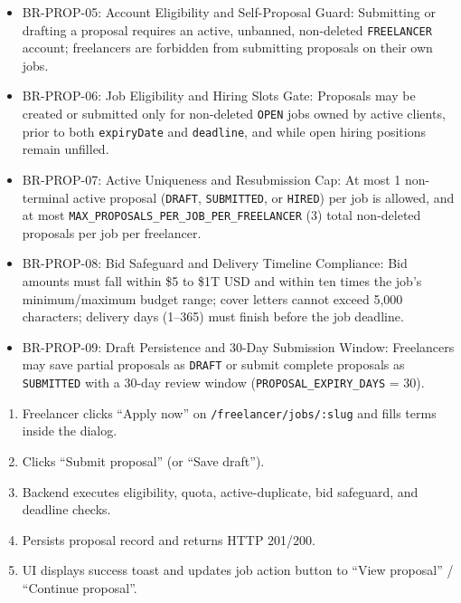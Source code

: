 \begin{itemize}[leftmargin=1.6em,topsep=3pt,itemsep=2pt,parsep=0pt,label=$\bullet$]\brrulelist
    \item BR-PROP-05: Account Eligibility and Self-Proposal Guard: Submitting or drafting a proposal requires an active, unbanned, non-deleted \texttt{FREELANCER} account; freelancers are forbidden from submitting proposals on their own jobs.
    \item BR-PROP-06: Job Eligibility and Hiring Slots Gate: Proposals may be created or submitted only for non-deleted \texttt{OPEN} jobs owned by active clients, prior to both \texttt{expiryDate} and \texttt{deadline}, and while open hiring positions remain unfilled.
    \item BR-PROP-07: Active Uniqueness and Resubmission Cap: At most 1 non-terminal active proposal (\texttt{DRAFT}, \texttt{SUBMITTED}, or \texttt{HIRED}) per job is allowed, and at most \texttt{MAX\_PROPOSALS\_PER\_JOB\_PER\_FREELANCER} (3) total non-deleted proposals per job per freelancer.
    \item BR-PROP-08: Bid Safeguard and Delivery Timeline Compliance: Bid amounts must fall within \$5 to \$1T USD and within ten times the job's minimum/maximum budget range; cover letters cannot exceed 5,000 characters; delivery days (1--365) must finish before the job deadline.
    \item BR-PROP-09: Draft Persistence and 30-Day Submission Window: Freelancers may save partial proposals as \texttt{DRAFT} or submit complete proposals as \texttt{SUBMITTED} with a 30-day review window (\texttt{PROPOSAL\_EXPIRY\_DAYS} = 30).
\end{itemize}

\begin{enumerate}[leftmargin=1.8em,topsep=3pt,itemsep=2pt,parsep=0pt]
    \item Freelancer clicks ``Apply now'' on \texttt{/freelancer/jobs/:slug} and fills terms inside the dialog.
    \item Clicks ``Submit proposal'' (or ``Save draft'').
    \item Backend executes eligibility, quota, active-duplicate, bid safeguard, and deadline checks.
    \item Persists proposal record and returns HTTP 201/200.
    \item UI displays success toast and updates job action button to ``View proposal'' / ``Continue proposal''.
\end{enumerate}

